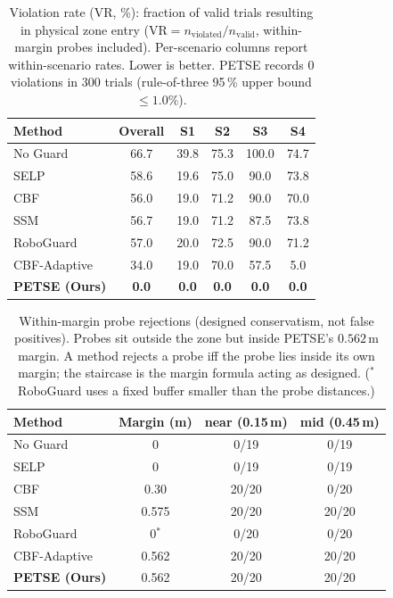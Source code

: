 \documentclass[conference]{IEEEtran}
\newcommand{\tblstyle}{\small\setlength{\tabcolsep}{4pt}}
\begin{document}
\begin{table}[t]
\centering
\tblstyle
\caption{Violation rate (VR, \%): fraction of valid trials resulting in physical zone entry ($\text{VR} = n_{\text{violated}} / n_{\text{valid}}$, within-margin probes included). Per-scenario columns report within-scenario rates. Lower is better. PETSE records $0$ violations in $300$ trials (rule-of-three 95\,\% upper bound $\le 1.0\%$).}
\label{tab:vr}
\footnotesize
\begin{tabular}{@{}l ccccc@{}}
\toprule
Method & Overall & S1 & S2 & S3 & S4 \\
\midrule
No Guard              & 66.7 & 39.8 &  75.3 & 100.0 & 74.7 \\
SELP                  & 58.6 & 19.6 &  75.0 &  90.0 & 73.8 \\
CBF                   & 56.0 & 19.0 &  71.2 &  90.0 & 70.0 \\
SSM                   & 56.7 & 19.0 &  71.2 &  87.5 & 73.8 \\
RoboGuard             & 57.0 & 20.0 &  72.5 &  90.0 & 71.2 \\
CBF-Adaptive          & 34.0 & 19.0 &  70.0 &  57.5 &  5.0 \\
\rowcolor{lightgray} \textbf{PETSE (Ours)} & \textbf{0.0} & \textbf{0.0} &
\textbf{0.0} & \textbf{0.0} & \textbf{0.0} \\
\bottomrule
\end{tabular}
\end{table}

\begin{table}[t]
\centering
\tblstyle
\caption{Within-margin probe rejections (designed conservatism, not false positives). Probes sit outside the zone but inside PETSE's $0.562$\,m margin. A method rejects a probe iff the probe lies inside its own margin; the staircase is the margin formula acting as designed. ($^{*}$RoboGuard uses a fixed buffer smaller than the probe distances.)}
\label{tab:probes}
\footnotesize
\begin{tabular}{@{}l c cc@{}}
\toprule
Method & Margin (m) & near (0.15\,m) & mid (0.45\,m) \\
\midrule
No Guard & 0 & 0/19 & 0/19 \\
SELP & 0 & 0/19 & 0/19 \\
CBF & 0.30 & 20/20 & 0/20 \\
SSM & 0.575 & 20/20 & 20/20 \\
RoboGuard & 0$^{*}$ & 0/20 & 0/20 \\
CBF-Adaptive & 0.562 & 20/20 & 20/20 \\
\rowcolor{lightgray} \textbf{PETSE (Ours)} & 0.562 & 20/20 & 20/20 \\
\bottomrule
\end{tabular}
\end{table}
\end{document}
